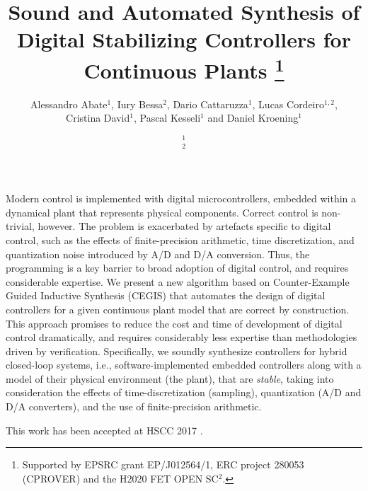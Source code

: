 \documentclass[final]{sig-alternate-05-2015}
\begin{document}

\title{
Sound and Automated Synthesis of Digital Stabilizing Controllers for Continuous
Plants%
\thanks{Supported by EPSRC grant EP/J012564/1,
ERC project 280053 (CPROVER) and the H2020 FET OPEN SC$^2$.}}

\author{Alessandro Abate$^{1}$, Iury Bessa$^{2}$, Dario Cattaruzza$^{1}$, Lucas Cordeiro$^{1,2}$, \\ 
Cristina David$^{1}$, Pascal Kesseli$^{1}$ and Daniel Kroening$^{1}$
\and
$^{1}$ \\
$^{2}$
}


\newcommand\tool{{\sf DSSynth}\xspace}

\maketitle

%
Modern control is implemented with digital microcontrollers, embedded within
a dynamical plant that represents physical components. Correct control is
non-trivial, however. The problem is exacerbated by artefacts specific to digital
control, such as the effects of finite-precision arithmetic, time discretization,
and quantization noise introduced by A/D and D/A conversion.  Thus, the
programming is a key barrier to broad adoption of digital control, and requires
considerable expertise.
%
We present a new algorithm based on Counter-Example Guided Inductive
Synthesis (CEGIS) that automates the design of digital controllers for a given
continuous plant model that are correct by construction. This approach
promises to reduce the cost and time of development of digital control
dramatically, and requires considerably less expertise than methodologies
driven by verification. Specifically, we soundly
synthesize controllers for hybrid closed-loop systems, i.e., software-implemented
embedded controllers along with a model of their physical environment (the plant),
that are \emph{stable}, taking into consideration the effects of time-discretization
(sampling), quantization (A/D and D/A converters), and the use of finite-precision arithmetic.

This work has been accepted at HSCC 2017 \cite{DBLP:journals/corr/AbateBCCDKK16}.
\end{document}
